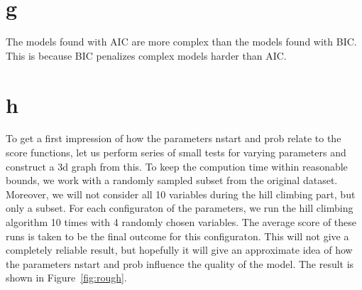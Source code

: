 \documentclass[12pt]{article}
\theoremstyle{definition}
\begin{document}





\section*{g}
The models found with AIC are more complex than the models found with BIC.
This is because BIC penalizes complex models harder than AIC.

\section*{h}
To get a first impression of how the parameters nstart and prob relate to the score functions,
let us perform series of small tests for varying parameters and construct a 3d graph from this.
To keep the compution time within reasonable bounds, we work with a randomly sampled subset
from the original dataset.
Moreover, we will not consider all 10 variables during the hill climbing part, but only a subset.
For each configuraton of the parameters, we run the hill climbing algorithm 10 times with 4
randomly chosen variables.
The average score of these runs is taken to be the final outcome for this configuraton.
This will not give a completely reliable result, but hopefully it will give an approximate
idea of how the parameters nstart and prob influence the quality of the model.
The result is shown in Figure~\ref{fig:rough}.
\end{document}
